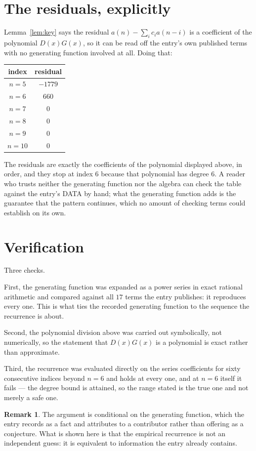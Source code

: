\documentclass[11pt,a4paper]{article}
\theoremstyle{plain}
\theoremstyle{definition}
\newtheorem{remark}[theorem]{Remark}
\begin{document}
\section{The residuals, explicitly}

Lemma~\ref{lem:key} says the residual $a(n)-\sum_ic_ia(n-i)$ is a coefficient of the
polynomial $D(x)G(x)$, so it can be read off the entry's own published terms with no
generating function involved at all. Doing that:
\begin{center}
\begin{tabular}{cc}
index & residual \\ \hline
$n=5$ & $-1779$ \\
$n=6$ & $660$ \\
$n=7$ & $0$ \\
$n=8$ & $0$ \\
$n=9$ & $0$ \\
$n=10$ & $0$
\end{tabular}
\end{center}
The residuals are exactly the coefficients of the polynomial displayed above, in order, and
they stop at index $6$ because that polynomial has degree $6$. A reader who trusts
neither the generating function nor the algebra can check the table against the entry's DATA
by hand; what the generating function adds is the guarantee that the pattern continues, which
no amount of checking terms could establish on its own.

\section{Verification}

Three checks.

First, the generating function was expanded as a power series in exact rational arithmetic and
compared against all $17$ terms the entry publishes: it reproduces every one. This is
what ties the recorded generating function to the sequence the recurrence is about.

Second, the polynomial division above was carried out symbolically, not numerically, so the
statement that $D(x)G(x)$ is a polynomial is exact rather than approximate.

Third, the recurrence was evaluated directly on the series coefficients for sixty consecutive
indices beyond $n=6$ and holds at every one, and at $n=6$ itself it fails --- the
degree bound is attained, so the range stated is the true one and not merely a safe one.

\begin{remark}
The argument is conditional on the generating function, which the entry records as a fact and
attributes to a contributor rather than offering as a conjecture. What is shown here is that
the empirical recurrence is not an independent guess: it is equivalent to information the
entry already contains.
\end{remark}
\end{document}
